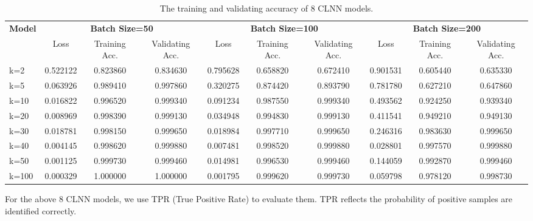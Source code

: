 \documentclass[conference]{IEEEtran}
\begin{document}
\begin{table}[htp]
  \caption{The training and validating accuracy of 8 CLNN models.}
  \label{tab:acc4models}
  \centering
  \begin{tabular}{l c c c c c c c c c}
    \hline
    \multirow{2}{*}{\textbf{Model}} & \multicolumn{3}{c}{\textbf{Batch Size=50}} & \multicolumn{3}{c}{\textbf{Batch Size=100}}&\multicolumn{3}{c}{\textbf{Batch Size=200}}\\
    \cline{2-10}
    &Loss&Training Acc.&Validating Acc.&Loss&Training Acc.&Validating Acc.&Loss&Training Acc.&Validating Acc.\\
    \hline
    k=2      & 0.522122  & 0.823860  &0.834630 & 0.795628  & 0.658820  &0.672410 & 0.901531  & 0.605440  &0.635330  \\

    k=5      & 0.063926  & 0.989410  &0.997860& 0.320275  & 0.874420  &0.893790& 0.781780  & 0.627210  &0.647860 \\

    k=10      & 0.016822  & 0.996520  &0.999340& 0.091234  & 0.987550  &0.999340& 0.493562  & 0.924250  &0.939340 \\

    k=20      & 0.008969  & 0.998390  &0.999130& 0.034948  & 0.994830  &0.999130& 0.411541  & 0.949210  &0.949130 \\

    k=30     & 0.018781  & 0.998150  &0.999650& 0.018984  & 0.997710  &0.999650& 0.246316  & 0.983630  &0.999650  \\

    k=40     & 0.004145  & 0.998620  &0.999880& 0.007481  & 0.998520  &0.999880& 0.028801  & 0.997570  &0.999880 \\

    k=50     & 0.001125  & 0.999730  &0.999460& 0.014981  & 0.996530  &0.999460& 0.144059  & 0.992870  &0.999460  \\

    k=100    & 0.000329  & 1.000000  &1.000000& 0.001795  & 0.999620  &0.999730& 0.059798  & 0.978120  &0.998730  \\
    \hline
  \end{tabular}
\end{table}

For the above 8 CLNN models, we use TPR (True Positive Rate) to evaluate them. TPR reflects the probability of positive samples are identified correctly.
\end{document}
